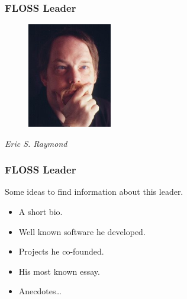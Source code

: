 \documentclass{beamer}
\begin{document}
\begin{frame}
\frametitle{FLOSS Leader}

\begin{figure}[h]
\begin{center}
  \includegraphics[height=1.80in]{figs/esr.jpg}
\end{center}
\end{figure}

\pause

\begin{center}
{\it Eric S. Raymond}
\end{center}

\end{frame}


\begin{frame}
\frametitle{FLOSS Leader}

Some ideas to find information about this leader.
\pause
\begin{itemize}
\item A short bio.
\item Well known software he developed.
\item Projects he co-founded.
\item His most known essay.
\item Anecdotes\ldots
\end{itemize}

\end{frame}
\end{document}
